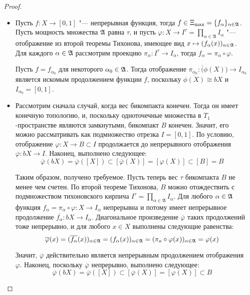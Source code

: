 \begin{proof}~
    \begin{itemize}
        \item{}Пусть $f: X\rightarrow [0, 1]$ "--- непрерывная функция, тогда $f \in \Xi_{\max} = \{f_{\alpha}\}_{\alpha \in \mathfrak A}$. Пусть мощность множества $\mathfrak A$ равна $\tau$, и пусть $\varphi: X \rightarrow I^{\tau} = \prod_{\alpha \in \mathfrak{A}}I_\alpha$ "--- отображение из второй теоремы Тихонова, имеющее вид $x \mapsto (f_\alpha(x))_{\alpha \in \mathfrak A}$. Для каждого $\alpha \in \mathfrak A$ рассмотрим проекцию $\pi_\alpha : I^\tau \to I_\alpha$, тогда $f_\alpha = \pi_\alpha \circ \varphi$.
        
        Пусть $f = f_{\alpha_0}$ для некоторого $\alpha_0 \in \mathfrak A$. Тогда отображение $\pi_{\alpha_0}: \overline(\phi(X)) \to I_{\alpha_0}$ является искомым продолжением функции $f$, поскольку $\overline{\phi(X)} \cong bX$ и $I_{\alpha_0} = [0, 1]$.

        \item{}Рассмотрим сначала случай, когда вес бикомпакта конечен. Тогда он имеет конечную топологию, и, поскольку одноточечные множества в $T_1$-пространстве являются замкнутыми, бикомпакт $B$ конечен. Значит, его можно рассматривать как подмножество отрезка $I = [0, 1]$. По условию, отображение $\varphi: X \rightarrow B \subset I$ продолжается до непрерывного отображения $\overline{\varphi}: bX \rightarrow I$. Наконец, выполнено следующее:
        \[\overline{\varphi}(bX) = \overline{\varphi}([X]) \subset [\overline{\varphi} (X)] = [\varphi(X)] \subset [B] = B\]

        Таким образом, получено требуемое. Пусть теперь вес $\tau$ бикомпакта $B$ не менее чем счетен. По второй теореме Тихонова, $B$ можно отождествить с подмножеством тихоновского кирпича $I^{\tau} = \prod_{\alpha \in \mathfrak{A}}I_\alpha$. Для любого $\alpha \in \mathfrak A$ функция $f_{\alpha} = \pi_\alpha \circ \varphi: X\rightarrow I_\alpha$ непрерывна и потому имеет непрерывное продолжение $\overline{f_\alpha}: bX \rightarrow I_\alpha$. Диагональное произведение $\overline{\varphi}$ таких продолжений тоже непрерывно, и для любого $x \in X$ выполнены следующие равенства:
        \[\overline{\varphi}(x) = (\overline{f_\alpha}(x))_{\alpha \in \mathfrak A} = (f_\alpha(x))_{\alpha \in \mathfrak A} = (\pi_a\circ\varphi(x))_{\alpha \in \mathfrak A} = \varphi(x)\]

        Значит, $\overline{\varphi}$ действительно является непрерывным продолжением отображения $\varphi$. Наконец, поскольку $\overline{\varphi}$ непрерывно, выполнено следующее:
        \[\overline{\varphi}(bX) = \overline{\varphi}([X]) \subset [\overline{\varphi}(X)] = [\varphi (X)] \subset B\]


\end{itemize}
\end{proof}
